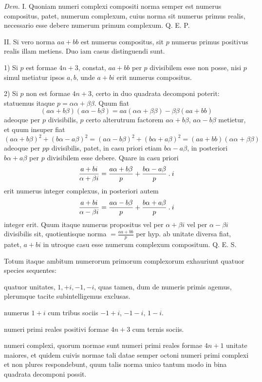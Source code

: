 \emph{Dem.} I. Quoniam numeri complexi compositi norma semper est numerus compositus, patet, numerum complexum, cuius norma sit numerus primus realis, necessario esse debere numerum primum complexum. Q. E. P.

II. Si vero norma $aa+bb$ est numerus compositus, sit $p$ numerus primus positivus realis illam metiens. Duo iam casus distinguendi sunt.

1) Si $p$ est formae $4n+3$, constat, $aa+bb$ per $p$ divisibilem esse non posse, nisi $p$ simul metiatur ipsos $a,b$, unde $a+bi$ erit numerus compositus.

2) Si $p$ non est formae $4n+3$, certo in duo quadrata decomponi poterit: statuemus itaque $p=\alpha\alpha+\beta\beta$. Quum fiat
\[
(a\alpha+b\beta)(a\alpha-b\beta)=aa(\alpha\alpha+\beta\beta)-\beta\beta(aa+bb)
\]
adeoque per $p$ divisibilis, $p$ certo alterutrum factorem $a\alpha+b\beta$, $a\alpha-b\beta$ metietur, et quum insuper fiat
\[
(a\alpha+b\beta)^2+(b\alpha-a\beta)^2=(a\alpha-b\beta)^2+(b\alpha+a\beta)^2=(aa+bb)(\alpha\alpha+\beta\beta)
\]
adeoque per $pp$ divisibilis, patet, in casu priori etiam $b\alpha-a\beta$, in posteriori $b\alpha+a\beta$ per $p$ divisibilem esse debere. Quare in casu priori
\[
\frac{a+bi}{\alpha+\beta i}=\frac{a\alpha+b\beta}{p}+\frac{b\alpha-a\beta}{p}\mathbin{.} i
\]
erit numerus integer complexus, in posteriori autem
\[
\frac{a+bi}{\alpha-\beta i}=\frac{a\alpha-b\beta}{p}+\frac{b\alpha+a\beta}{p}\mathbin{.} i
\]
integer erit. Quum itaque numerus propositus vel per $\alpha+\beta i$ vel per $\alpha-\beta i$ divisibilis sit, quotientisque norma $=\frac{aa+bb}{p}$ per hyp. ab unitate diversa fiat, patet, $a+bi$ in utroque casu esse numerum complexum compositum. Q. E. S.

%
Totum itaque ambitum numerorum primorum complexorum exhauriunt quatuor species sequentes:

\begin{list}{}{\setlength{\leftmargin}{1.7em}\setlength{\labelwidth}{1.5em}\setlength{\labelsep}{.2em}}
\item[1)] quatuor unitates, $1,+i,-1,-i$, quas tamen, dum de numeris primis agemus, plerumque tacite subintelligemus exclusas.
\item[2)] numerus $1+i$ cum tribus sociis $-1+i$, $-1-i$, $1-i$.
\item[3)] numeri primi reales positivi formae $4n+3$ cum ternis sociis.
\item[4)] numeri complexi, quorum normae sunt numeri primi reales formae $4n+1$ unitate maiores, et quidem cuivis normae tali datae semper octoni numeri primi complexi et non plures respondebunt, quum talis norma unico tantum modo in bina quadrata decomponi possit.
\end{list}

